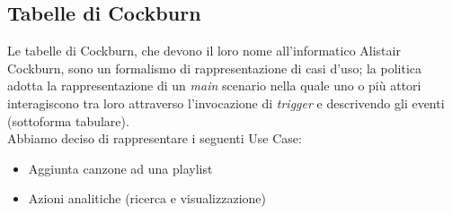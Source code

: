 \documentclass{article}
\begin{document}
		\subsection{Tabelle di Cockburn}
		Le tabelle di Cockburn, che devono il loro nome all'informatico Alistair Cockburn, sono un formalismo di rappresentazione di casi d'uso; la politica adotta la rappresentazione di un \textit{main} scenario nella quale uno o più attori interagiscono tra loro attraverso l'invocazione di \textit{trigger} e descrivendo gli eventi (sottoforma tabulare).\\
		Abbiamo deciso di rappresentare i seguenti Use Case:
		\begin{itemize}
			\item Aggiunta canzone ad una playlist 
			\item Azioni analitiche (ricerca e visualizzazione)
		\end{itemize}
		\newpage
		
		\newpage
		
		\newpage
		
\end{document}
